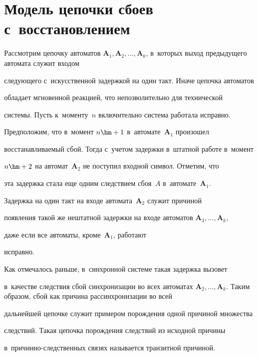\section{Модель цепочки сбоев с~восстановлением}





  Рассмотрим цепочку автоматов $\mathbf{A}_1, \mathbf{A}_2, \ldots , 


\mathbf{A}_k$, в~которых выход предыду\-ще\-го автомата служит входом 


сле\-ду\-юще\-го с~искусственной задержкой на один такт. Иначе цепочка автоматов 


обладает мгновенной реакцией, что не\-поз\-во\-ли\-тель\-но для технической 


 сис\-те\-мы. Пусть к~моменту~$n$ включительно сис\-те\-ма работала ис\-прав\-но. 


Предположим, что в~момент $n\hm+1$ в~автомате~\textbf{A}$_1$ произошел 


восстанавливаемый сбой. Тогда с~учетом за\-держ\-ки в~штат\-ной работе в~момент 


$n\hm+2$ на автомат~\textbf{A}$_2$ не по\-сту\-пил вход\-ной символ. Отметим, что 


эта за\-держ\-ка стала еще одним следствием сбоя~$A$ в~автомате~\textbf{A}$_1$. 


За\-держ\-ка на один такт на входе автомата~\textbf{A}$_2$ служит причиной 


появления такой же не\-шта\-тной задержки на входе автоматов $\mathbf{A}_3, \ldots , \mathbf{A}_k$, 


даже если все автоматы, кроме~\textbf{A}$_1$, работают 


ис\-правно. 


  


  Как отмечалось раньше, в~синхронной сис\-те\-ме такая за\-держ\-ка вызовет 


  в~качестве следствия сбой синхронизации во всех автоматах $\mathbf{A}_2, \ldots , 


\mathbf{A}_k$. Таким образом, сбой как причина рассинхронизации во всей 


дальнейшей цепочке служит примером порождения одной причиной множества 


следствий. Такая цепочка по\-рож\-де\-ния следствий из исходной причины  


в~при\-чин\-но-след\-ст\-вен\-ных связях называется транзитной причиной. 


